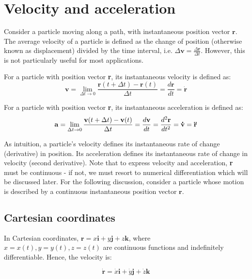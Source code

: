 \documentclass[12pt]{article}
\begin{document}
\newpage

\section{Velocity and acceleration}

Consider a particle moving along a path, with instantaneous position vector $\mathbf{r}$. The average velocity of a particle is defined as the change of position (otherwise known as displacement) divided by the time interval, i.e. $\Delta \mathbf{v} = \frac{\Delta \mathbf{r}}{\Delta t}$. However, this is not particularly useful for most applications.

\begin{definition}
    For a particle with position vector \textbf{r}, its instantaneous velocity is defined as:
    \[ \mathbf{v} = \lim_{\Delta t \to 0} \frac{\mathbf{r}(t + \Delta t) - \mathbf{r}(t)}{\Delta t} = \frac{d\mathbf{r}}{dt} = \dot{\mathbf{r}}\] 
\end{definition}

\begin{definition}
    For a particle with position vector \textbf{r}, its instantaneous acceleration is defined as:
    \[ \mathbf{a} = \lim_{\Delta t \to 0} \frac{\mathbf{v}(t + \Delta t) - \mathbf{v}(t)}{\Delta t} = \frac{d\mathbf{v}}{dt} = \frac{d^2\mathbf{r}}{dt^2} = \mathbf{\dot{v}} = \mathbf{\Ddot{r}}\]
\end{definition}

As intuition, a particle's velocity defines its instantaneous rate of change (derivative) in position. Its acceleration defines its instantaneous rate of change in velocity (second derivative). Note that to express velocity and acceleration, \textbf{r} must be continuous - if not, we must resort to numerical differentiation which will be discussed later. For the following discussion, consider a particle whose motion is described by a continuous instantaneous position vector $\mathbf{r}$.

\subsection{Cartesian coordinates}

In Cartesian coordinates, $\mathbf{r} = x\mathbf{i} + y\mathbf{j} + z\mathbf{k}$, where $x = x(t), y = y(t), z = z(t)$ are continuous functions and indefinitely differentiable. Hence, the velocity is:

\[ \mathbf{\dot{r}} = \dot{x}\mathbf{i} + \dot{y}\mathbf{j} + \dot{z}\mathbf{k}\]
\end{document}
